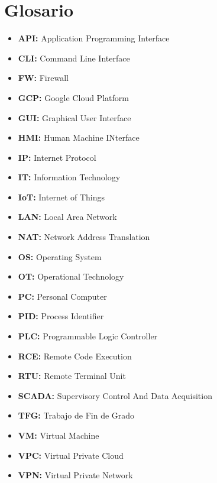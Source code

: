 \newpage
\thispagestyle{plain}
\section*{Glosario}

\begin{itemize} 
  \item \textbf{API:} Application Programming Interface
  \item \textbf{CLI:} Command Line Interface
  \item \textbf{FW:} Firewall
  \item \textbf{GCP:} Google Cloud Platform
  \item \textbf{GUI:} Graphical User Interface
  \item \textbf{HMI:} Human Machine INterface
  \item \textbf{IP:} Internet Protocol
  \item \textbf{IT:} Information Technology
  \item \textbf{IoT:} Internet of Things
  \item \textbf{LAN:} Local Area Network
  \item \textbf{NAT:} Network Address Translation
  \item \textbf{OS:} Operating System   
  \item \textbf{OT:} Operational Technology
  \item \textbf{PC:} Personal Computer
  \item \textbf{PID:} Process Identifier
  \item \textbf{PLC:} Programmable Logic Controller
  \item \textbf{RCE:} Remote Code Execution
  \item \textbf{RTU:} Remote Terminal Unit
  \item \textbf{SCADA:} Supervisory Control And Data Acquisition
  \item \textbf{TFG:} Trabajo de Fin de Grado
  \item \textbf{VM:} Virtual Machine
  \item \textbf{VPC:} Virtual Private Cloud
  \item \textbf{VPN:} Virtual Private Network 
\end{itemize}

\afterpage{\blankpage}
